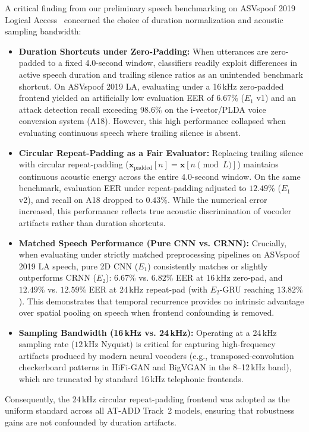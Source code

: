 A critical finding from our preliminary speech benchmarking on ASVspoof 2019 Logical Access~\cite{wang2020asvspoof} concerned the choice of duration normalization and acoustic sampling bandwidth:
\begin{itemize}
  \item \textbf{Duration Shortcuts under Zero-Padding:} When utterances are zero-padded to a fixed 4.0-second window, classifiers readily exploit differences in active speech duration and trailing silence ratios as an unintended benchmark shortcut. On ASVspoof 2019 LA, evaluating under a 16\,kHz zero-padded frontend yielded an artificially low evaluation EER of $6.67\%$ ($E_1$ v1) and an attack detection recall exceeding $98.6\%$ on the i-vector/PLDA voice conversion system (A18). However, this high performance collapsed when evaluating continuous speech where trailing silence is absent.
  \item \textbf{Circular Repeat-Padding as a Fair Evaluator:} Replacing trailing silence with circular repeat-padding ($\mathbf{x}_{\mathrm{padded}}[n] = \mathbf{x}[n \pmod L]$) maintains continuous acoustic energy across the entire 4.0-second window. On the same benchmark, evaluation EER under repeat-padding adjusted to $12.49\%$ ($E_1$ v2), and recall on A18 dropped to $0.43\%$. While the numerical error increased, this performance reflects true acoustic discrimination of vocoder artifacts rather than duration shortcuts.
  \item \textbf{Matched Speech Performance (Pure CNN vs. CRNN):} Crucially, when evaluating under strictly matched preprocessing pipelines on ASVspoof 2019 LA speech, pure 2D CNN ($E_1$) consistently matches or slightly outperforms CRNN ($E_2$): $6.67\%$ vs. $6.82\%$ EER at 16\,kHz zero-pad, and $12.49\%$ vs. $12.59\%$ EER at 24\,kHz repeat-pad (with $E_2$-GRU reaching $13.82\%$). This demonstrates that temporal recurrence provides no intrinsic advantage over spatial pooling on speech when frontend confounding is removed.
  \item \textbf{Sampling Bandwidth (16\,kHz vs. 24\,kHz):} Operating at a 24\,kHz sampling rate ($12\,\text{kHz}$ Nyquist) is critical for capturing high-frequency artifacts produced by modern neural vocoders (e.g., transposed-convolution checkerboard patterns in HiFi-GAN and BigVGAN in the 8--12\,kHz band), which are truncated by standard 16\,kHz telephonic frontends.
\end{itemize}
Consequently, the 24\,kHz circular repeat-padding frontend was adopted as the uniform standard across all AT-ADD Track~2 models, ensuring that robustness gains are not confounded by duration artifacts.

